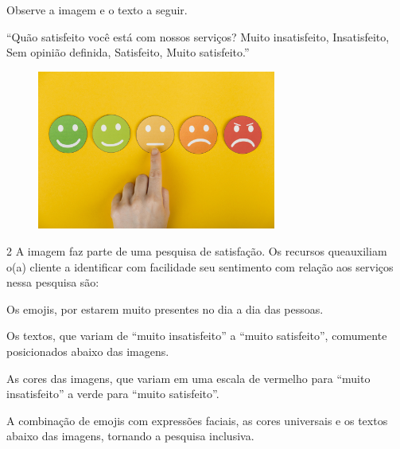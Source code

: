 
Observe a imagem e o texto a seguir.


\begin{myquote}
``Quão satisfeito você está com nossos serviços? Muito insatisfeito,
Insatisfeito, Sem opinião definida, Satisfeito, Muito satisfeito.'' 
\begin{figure}[H]
\centering\includegraphics[width=0.7\textwidth]{./imgSAEB_6_POR/freepik/PORT_6_IMG-6.jpeg}
\end{figure}
\end{myquote}
\num{2} A imagem faz parte de uma pesquisa de satisfação. Os recursos queauxiliam o(a) cliente a identificar com facilidade seu sentimento com
relação aos serviços nessa pesquisa são:

\begin{escolha}
\item Os emojis, por estarem muito presentes no dia a dia das pessoas.
\item Os textos, que variam de ``muito insatisfeito'' a ``muito
satisfeito'', comumente posicionados abaixo das imagens.
\item As cores das imagens, que variam em uma escala de vermelho para
``muito insatisfeito'' a verde para ``muito satisfeito''.
\item A combinação de emojis com expressões faciais, as cores universais e
os textos abaixo das imagens, tornando a pesquisa inclusiva.
\end{escolha}


